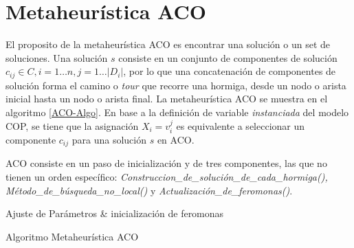 \section{Metaheur\'istica ACO}
El proposito de la metaheur\'istica ACO es encontrar una soluci\'on o un set de soluciones. Una soluci\'on $s$ consiste en un conjunto de componentes de soluci\'on $c_{ij} \in C, i = 1 \dotsc n, j = 1 \dotsc |D_i|$, por lo que una concatenaci\'on de componentes de soluci\'on forma el camino o {\it tour} que recorre una hormiga, desde un nodo o arista inicial hasta un nodo o arista final. La metaheur\'istica ACO se muestra en el algoritmo \ref{ACO-Algo}. En base a la definici\'on de variable {\it instanciada} del modelo COP, se tiene que la asignaci\'on $X_i = v_{i}^{j}$ es equivalente a seleccionar un componente $c_{ij}$ para una soluci\'on $s$ en ACO.

ACO consiste en un paso de inicializaci\'on y de tres componentes, las que no tienen un orden espec\'ifico: {\it Construccion\_de\_soluci\'on\_de\_cada\_hormiga(),  M\'etodo\_de\_b\'usqueda\_no\_local()} y {\it Actualizaci\'on\_de\_feromonas()}.


\begin{algorithm}[H]
\SetAlgoLined
{}
 Ajuste de Par\'ametros \& inicializaci\'on de feromonas \;
 \caption{Algoritmo Metaheur\'istica ACO}\label{ACO-Algo}
\end{algorithm}


